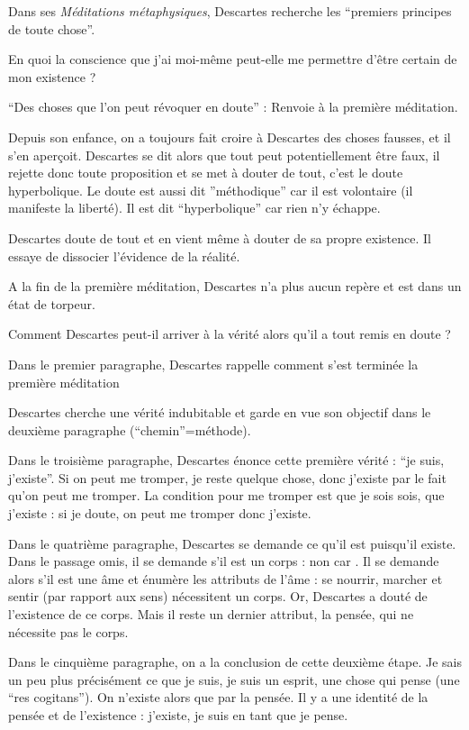 \documentclass[french]{book}
\theoremstyle{definition}
\begin{document}
Dans ses \textit{Méditations métaphysiques}, Descartes recherche les “premiers principes de toute chose”.

En quoi la conscience que j'ai moi-même peut-elle me permettre d'être certain de mon existence ?

“Des choses que l’on peut révoquer en doute” : Renvoie à la première méditation.

Depuis son enfance, on a toujours fait croire à Descartes des choses fausses, et il s’en aperçoit. Descartes se dit alors que tout peut potentiellement être faux, il rejette donc toute proposition et se met à douter de tout, c’est le doute hyperbolique.
Le doute est aussi dit ”méthodique” car il est volontaire (il manifeste la liberté).
Il est dit “hyperbolique” car rien n’y échappe.

Descartes doute de tout et en vient même à douter de sa propre existence. Il essaye de dissocier l’évidence de la réalité.

A la fin de la première méditation, Descartes n’a plus aucun repère et est dans un état de torpeur.

Comment Descartes peut-il arriver à la vérité alors qu’il a tout remis en doute ?

Dans le premier paragraphe, Descartes rappelle comment s’est terminée la première méditation

Descartes cherche une vérité indubitable et garde en vue son objectif dans le deuxième paragraphe (“chemin”=méthode).

Dans le troisième paragraphe, Descartes énonce cette première vérité : “je suis, j’existe”. Si on peut me tromper, je reste quelque chose, donc j’existe par le fait qu’on peut me tromper. La condition pour me tromper est que je sois sois, que j'existe : si je doute, on peut me tromper donc j’existe.

Dans le quatrième paragraphe, Descartes se demande ce qu’il est puisqu'il existe. Dans le passage omis, il se demande s’il est un corps : non car . Il se demande alors s’il est une âme et énumère les attributs de l’âme : se nourrir, marcher et sentir (par rapport aux sens) nécessitent un corps. Or, Descartes a douté de l’existence de ce corps. Mais il reste un dernier attribut, la pensée, qui ne nécessite pas le corps.

Dans le cinquième paragraphe, on a la conclusion de cette deuxième étape. Je sais un peu plus précisément ce que je suis, je suis un esprit, une chose qui pense (une “res cogitans”). On n’existe alors que par la pensée. Il y a une identité de la pensée et de l’existence : j’existe, je suis en tant que je pense.
\end{document}
